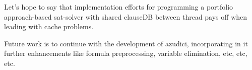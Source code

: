 Let's hope to say that implementation efforts for programming a
portfolio approach-based sat-solver with shared clauseDB between
thread pays off when leading with cache problems.

Future work is to continue with the development of  azudici,
incorporating in it further enhancements like formula preprocessing,
variable elimination, etc, etc, etc.

